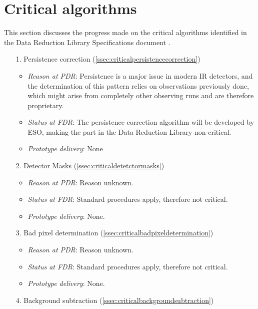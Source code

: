 \clearpage
\section{Critical algorithms}\label{sec:critical_algorithms}

This section discusses the progress made on the critical algorithms identified in the Data Reduction Library Specifications document \cite{DRLS}.

\begin{enumerate}
    \item[1.] Persistence correction (\ref{ssec:criticalpersistencecorrection})
    \begin{itemize}
        \item \textit{Reason at PDR}: Persistence is a major issue in modern IR detectors, and the determination of this pattern relies on observations previously done, which might arise from completely other observing runs and are therefore proprietary.
        \item \textit{Status at FDR}: The persistence correction algorithm will be developed by ESO, making the part in the Data Reduction Library non-critical.
        \item \textit{Prototype delivery}: None
    \end{itemize}
    \item[2.] Detector Masks (\ref{ssec:criticaldetetctormasks})
    \begin{itemize}
        \item \textit{Reason at PDR}: Reason unknown.
        \item \textit{Status at FDR}: Standard procedures apply, therefore not critical.
        \item \textit{Prototype delivery}: None.
    \end{itemize}
    \item[3.] Bad pixel determination (\ref{ssec:criticalbadpixeldetermination})
    \begin{itemize}
        \item \textit{Reason at PDR}: Reason unknown.
        \item \textit{Status at FDR}: Standard procedures apply, therefore not critical.
        \item \textit{Prototype delivery}: None.
    \end{itemize}
    \item[4.] Background subtraction (\ref{ssec:criticalbackgroundsubtraction})
    \begin{itemize}

\end{itemize}
\end{enumerate}
